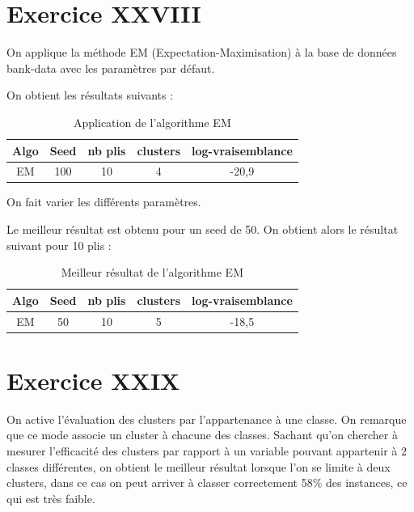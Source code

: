 \documentclass[a4paper, 11pt]{report}
\begin{document}
        \section{Exercice XXVIII}
        On applique la méthode EM (Expectation-Maximisation) à la base de données bank-data avec les paramètres par défaut.
        
        On obtient les résultats suivants :
        \begin{table}[h!]
        \centering
        \begin{tabular}{| c | c | c | c | c |}
        \hline
         Algo & Seed & nb plis & clusters & log-vraisemblance  \\
         \hline
         EM & 100 & 10 & 4 & -20,9 \\
         \hline
        \end{tabular}
        \caption{Application de l'algorithme EM}
        \label{tab:exo28}
        \end{table}
        
        On fait varier les différents paramètres.
        
        Le meilleur résultat est obtenu pour un seed de 50. On obtient alors le résultat suivant pour 10 plis :
        \begin{table}[h!]
        \centering
        \begin{tabular}{| c | c | c | c | c |}
        \hline
         Algo & Seed & nb plis & clusters & log-vraisemblance  \\
         \hline
         EM & 50 & 10 & 5 & -18,5 \\
         \hline
        \end{tabular}
        \caption{Meilleur résultat de l'algorithme EM}
        \label{tab:exo282}
        \end{table}
        
        \section{Exercice XXIX}
        On active l'évaluation des clusters par l'appartenance à une classe. On remarque que ce mode associe un cluster à chacune des classes. Sachant qu'on chercher à mesurer l'efficacité des clusters par rapport à un variable pouvant appartenir à 2 classes différentes, on obtient le meilleur résultat lorsque l'on se limite à deux clusters, dans ce cas on peut arriver à classer correctement 58\% des instances, ce qui est très faible. 
        
\end{document}
